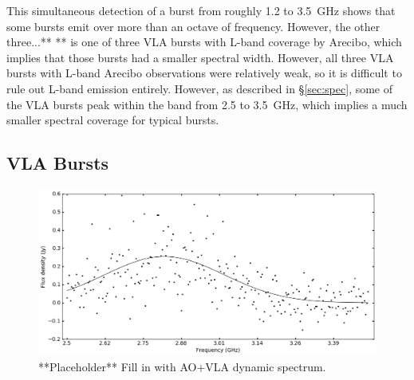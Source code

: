 \documentclass[twocolumn]{aastex61}
\begin{document}
This simultaneous detection of a burst from roughly 1.2 to 3.5~GHz shows that some bursts emit over more than an octave of frequency. However, the other three...**
**
 is one of three VLA bursts with L-band coverage by Arecibo, which implies that those bursts had a smaller spectral width. However, all three VLA bursts with L-band Arecibo observations were relatively weak, so it is difficult to rule out L-band emission entirely. However, as described in \S \ref{sec:spec}, some of the VLA bursts peak within the band from 2.5 to 3.5~GHz, which implies a much smaller spectral coverage for typical bursts.

\subsection{VLA Bursts}

\begin{figure}[htb]
\begin{center}
%
%
 \includegraphics[width=1.9\columnwidth]{spec_57648.png}
 \caption{**Placeholder** Fill in with AO+VLA dynamic spectrum.
 \label{fig:sgram}}
\end{center}
\end{figure}
\end{document}

